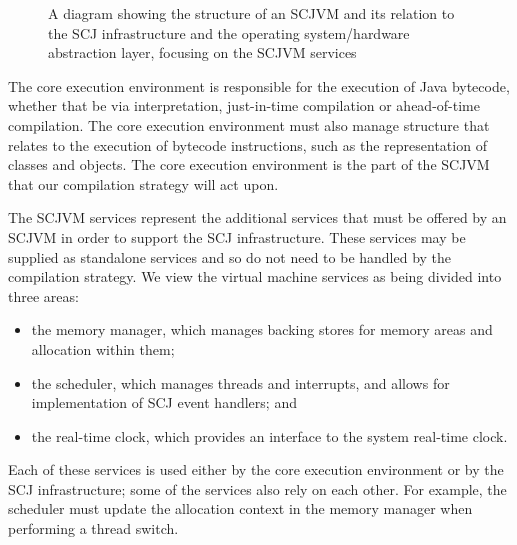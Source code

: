 \documentclass[a4paper,10pt]{report}
\begin{document}
\begin{figure}[ht]
  \caption{A diagram showing the structure of an SCJVM and its
    relation to the SCJ infrastructure and the operating
    system/hardware abstraction layer, focusing on the SCJVM services}
  \label{scjvm-services-fig}
\end{figure}

The core execution environment is responsible for the execution of
Java bytecode, whether that be via interpretation, just-in-time
compilation or ahead-of-time compilation.
The core execution environment must also manage structure that
relates to the execution of bytecode instructions, such as the
representation of classes and objects.
The core execution environment is the part of the SCJVM that our
compilation strategy will act upon.

The SCJVM services represent the additional services that must be
offered by an SCJVM in order to support the SCJ infrastructure.
These services may be supplied as standalone services and so do not
need to be handled by the compilation strategy.
We view the virtual machine services as being divided into three areas: 
\begin{itemize}
\item the memory manager, which manages backing stores for memory areas and
  allocation within them;
\item the scheduler, which manages threads and interrupts, and allows for
  implementation of SCJ event handlers; and
\item the real-time clock, which provides an interface to the system real-time
  clock.
\end{itemize}
Each of these services is used either by the core execution environment or by
the SCJ infrastructure; some of the services also rely on each other.  For
example, the scheduler must update the allocation context in the memory manager
when performing a thread switch.
\end{document}
